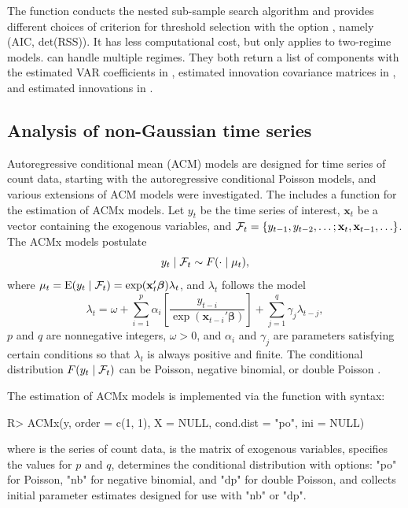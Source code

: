 The function  conducts the nested sub-sample search algorithm and provides different choices of criterion for threshold selection with the option , namely (AIC, det(RSS)). It has less computational cost, but only applies to two-regime models.  can handle multiple regimes. They both return a list of components with the estimated VAR coefficients in , estimated innovation covariance matrices in , and estimated innovations in .


\subsection{Analysis of non-Gaussian time series}
Autoregressive conditional mean (ACM) models are designed for time series of count data, starting with the autoregressive conditional Poisson models, and various extensions of ACM models were investigated. The  includes a function  for the estimation of ACMx models. Let $y_t$ be the time series of interest, $\mathbf{x}_t$ be a vector containing the exogenous variables, and ${\cal{F}}_t=\{ y_{t-1},y_{t-2},\ldots; \mathbf{x}_t, \mathbf{x}_{t-1},\ldots \}$. The ACMx models postulate
\[
y_t\mid {\cal F}_t \sim F(\cdot \mid \mu_t),
\]
where $\mu_t={\rm E}(y_t \mid {\cal F}_t)= \exp ({\mathbf x}_t' {\boldsymbol{\beta}})\lambda_t$,
and $\lambda_t$ follows the model
\[
\lambda_t=\omega+\sum_{i=1}^p \alpha_i\left[ \frac{y_{t-i}}{\exp(\mathbf{x}_{t-i}' \boldsymbol{\beta})}\right] +\sum_{j=1}^q \gamma_j \lambda_{t-j},
\]
$p$ and $q$ are nonnegative integers, $\omega>0$, and $\alpha_i$ and $\gamma_j$ are parameters satisfying certain conditions so that $\lambda_t$ is always positive and finite. The conditional distribution $F(y_t\mid {\cal F}_t)$ can be Poisson, negative binomial, or double Poisson \citep{tsay2018}.

The estimation of ACMx models is implemented via the function  with syntax:
\begin{example}
R> ACMx(y, order = c(1, 1), X = NULL, cond.dist = "po", ini = NULL)
\end{example}
where  is the series of count data,  is the matrix of exogenous variables,  specifies the values for $p$ and $q$,  determines the conditional distribution with options: "po" for Poisson, "nb" for negative binomial, and "dp" for double Poisson,
and  collects initial parameter estimates designed for use with "nb" or "dp".


